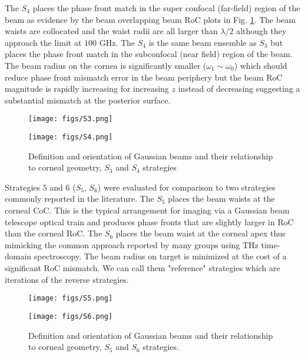 \documentclass{osa-article}
\begin{document}
The $S_4$ places the phase front match in the super confocal (far-field) region of the beam as evidence by the beam overlapping beam RoC plots in Fig. \ref{s34}. The beam waists are collocated and the waist radii are all larger than $\lambda/2$ although they approach the limit at $100$ GHz. The $S_4$ is the same beam ensemble as $S_3$ but places the phase front match in the subconfocal (near field) region of the beam. The beam radius on the cornea is significantly smaller ($\omega_1 \sim \omega_0$) which should reduce phase front mismatch error in the beam periphery but the beam RoC magnitude is rapidly increasing for increasing $z$ instead of decreasing suggesting a substantial mismatch at the posterior surface.
\begin{figure}[t]
\texttt{[image: figs/S3.png]}
\vspace*{-7 mm}

\texttt{[image: figs/S4.png]}
\caption{Definition and orientation of Gaussian beams and their relationship to corneal geometry, $S_3$ and $S_4$ strategies}\label{s34}
\end{figure}

Strategies $5$ and $6$ ($S_5$, $S_6$) were evaluated for comparison to two strategies commonly reported in the literature. The $S_5$ places the beam waists at the corneal CoC. This is the typical arrangement for imaging via a Gaussian beam telescope optical train and produces phase fronts that are slightly larger in RoC than the corneal RoC. The $S_6$ places the beam waist at the corneal apex thus mimicking the common approach reported by many groups using THz time-domain spectroscopy. The beam radius on target is minimized at the cost of a significant RoC mismatch. We can call them "reference" strategies which are iterations of the reverse strategies.
\begin{figure}[ht]
\texttt{[image: figs/S5.png]}
\vspace*{-7 mm}

\texttt{[image: figs/S6.png]}
\caption{Definition and orientation of Gaussian beams and their relationship to corneal geometry, $S_5$ and $S_6$ strategies.}\label{s56}
\end{figure}
\end{document}
